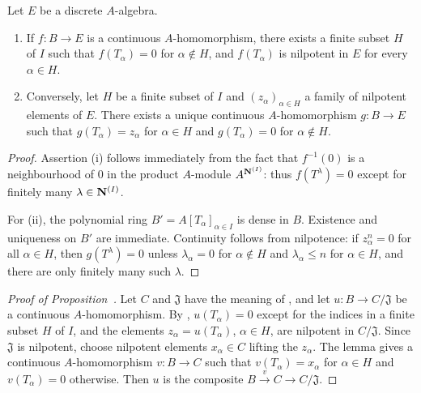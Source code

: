 \begin{lemma}[19.3.4.1]
\label{0.19.3.4.1}
Let $E$ be a discrete $A$-algebra.
\begin{enumerate}
  \item[\rm(i)] If $f:B\to E$ is a continuous $A$-homomorphism, there exists a finite subset $H$ of $I$ such that $f(T_\alpha)=0$ for $\alpha\notin H$, and $f(T_\alpha)$ is nilpotent in $E$ for every $\alpha\in H$.
  \item[\rm(ii)] Conversely, let $H$ be a finite subset of $I$ and $(z_\alpha)_{\alpha\in H}$ a family of nilpotent elements of $E$.
  There exists a unique continuous $A$-homomorphism $g:B\to E$ such that $g(T_\alpha)=z_\alpha$ for $\alpha\in H$ and $g(T_\alpha)=0$ for $\alpha\notin H$.
\end{enumerate}
\end{lemma}


\begin{proof}
Assertion (i) follows immediately from the fact that $f^{-1}(0)$ is a neighbourhood of $0$ in the product $A$-module $A^{\mathbf{N}^{(I)}}$: thus $f(T^\lambda)=0$ except for finitely many $\lambda\in\mathbf{N}^{(I)}$.

For (ii), the polynomial ring $B'=A[T_\alpha]_{\alpha\in I}$ is dense in $B$.
Existence and uniqueness on $B'$ are immediate.
Continuity follows from nilpotence: if $z_\alpha^n=0$ for all $\alpha\in H$, then $g(T^\lambda)=0$ unless $\lambda_\alpha=0$ for $\alpha\notin H$ and $\lambda_\alpha\leq n$ for $\alpha\in H$, and there are only finitely many such $\lambda$.
\end{proof}

\begin{proof}[Proof of Proposition~{\rm{}}]
Let $C$ and $\mathfrak{J}$ have the meaning of , and let $u:B\to C/\mathfrak{J}$ be a continuous $A$-homomorphism.
By , $u(T_\alpha)=0$ except for the indices in a finite subset $H$ of $I$, and the elements $z_\alpha=u(T_\alpha)$, $\alpha\in H$, are nilpotent in $C/\mathfrak{J}$.
Since $\mathfrak{J}$ is nilpotent, choose nilpotent elements $x_\alpha\in C$ lifting the $z_\alpha$.
The lemma gives a continuous $A$-homomorphism $v:B\to C$ such that $v(T_\alpha)=x_\alpha$ for $\alpha\in H$ and $v(T_\alpha)=0$ otherwise.
Then $u$ is the composite $B\xrightarrow{v}C\to C/\mathfrak{J}$.
\end{proof}

